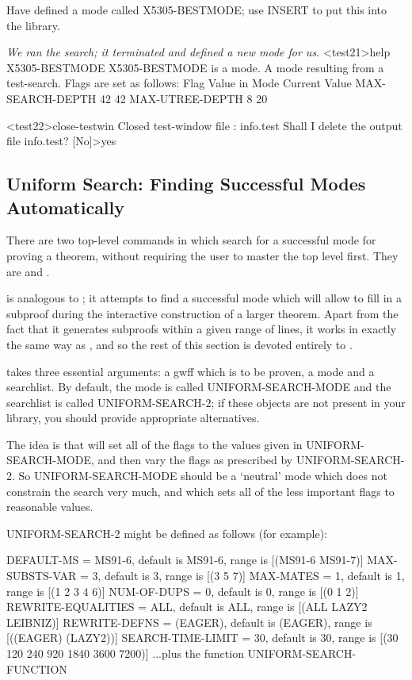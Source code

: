 \begin{tpsexample}
Have defined a mode called X5305-BESTMODE; use INSERT to put this into the library.

{\it We ran the search; it terminated and defined a new mode for us.}
<test21>help X5305-BESTMODE
X5305-BESTMODE is a mode.
A mode resulting from a test-search.
Flags are set as follows:
   Flag                     Value in Mode         Current Value
   MAX-SEARCH-DEPTH         42                    42
   MAX-UTREE-DEPTH          8                     20

<test22>close-testwin
Closed test-window file : info.test
Shall I delete the output file info.test?  [No]>yes

\end{tpsexample}

\subsection{Uniform Search: Finding Successful Modes Automatically}\label{uniform}

There are two top-level commands in {\TPS} which search for a successful mode for
proving a theorem, without requiring the user to master the  top level first.
They are  and .

 is analogous to ; it attempts
to find a successful mode which will allow {\TPS} to fill in a subproof during the
interactive construction of a larger theorem. Apart from the fact that it generates
subproofs within a given range of lines, it works in exactly the same way as
, and so the rest of this section is devoted entirely to
.

 takes three essential arguments: a gwff which is to be proven,
a mode and a searchlist. By default, the mode is called UNIFORM-SEARCH-MODE and the
searchlist is called UNIFORM-SEARCH-2; if these objects are not present in your library,
you should provide appropriate alternatives.

The idea is that {\TPS} will set all of the flags to the values given in UNIFORM-SEARCH-MODE,
and then vary the flags as prescribed by UNIFORM-SEARCH-2. So UNIFORM-SEARCH-MODE should
be a `neutral' mode which does not constrain the search very much, and which sets all of
the less important flags to reasonable values.

UNIFORM-SEARCH-2 might be defined as follows (for example):
\begin{tpsexample}
DEFAULT-MS = MS91-6, default is MS91-6, range is [(MS91-6 MS91-7)]
MAX-SUBSTS-VAR = 3, default is 3, range is [(3 5 7)]
MAX-MATES = 1, default is 1, range is [(1 2 3 4 6)]
NUM-OF-DUPS = 0, default is 0, range is [(0 1 2)]
REWRITE-EQUALITIES = ALL, default is ALL, range is [(ALL LAZY2 LEIBNIZ)]
REWRITE-DEFNS = (EAGER), default is (EAGER), range is [((EAGER) (LAZY2))]
SEARCH-TIME-LIMIT = 30, default is 30, range is [(30 120 240 920 1840 3600 7200)]
...plus the function UNIFORM-SEARCH-FUNCTION
\end{tpsexample}

